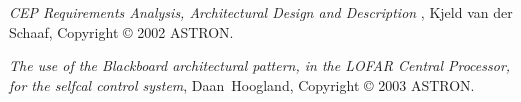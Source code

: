 \documentclass[]{lofar}
\begin{document}
  
  \begin{thebibliography}{WIDELABEL}

      \emph{CEP Requirements Analysis, Architectural Design and
      Description} , Kjeld van der Schaaf, Copyright \copyright{} 2002
      ASTRON.

      \emph{The use of the Blackboard architectural pattern, in the LOFAR Central Processor, for the selfcal control system},
      Daan\ Hoogland,
      Copyright \copyright{} 2003 ASTRON.

  \end{thebibliography}
\end{document}
